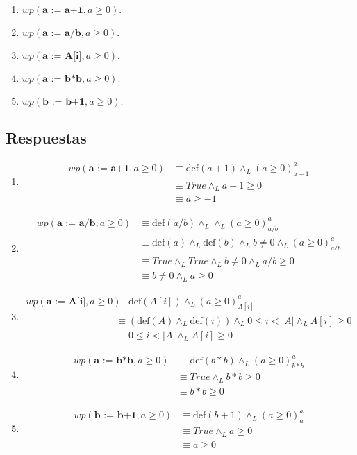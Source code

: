 \documentclass{article}
\begin{document}
\begin{enumerate}[label=\alph*)]
\item $wp(\textbf{a := a+1}, a \geq 0).$
\item $wp(\textbf{a := a/b}, a \geq 0).$
\item $wp(\textbf{a := A[i]}, a \geq 0).$
\item $wp(\textbf{a := b*b}, a \geq 0).$
\item $wp(\textbf{b := b+1}, a \geq 0).$
\end{enumerate}

\subsection*{Respuestas}

\begin{enumerate}[label=\alph*)]
	\item 
		\begin{align*}
			wp(\textbf{a := a+1}, a \geq 0) &\equiv \textrm{def}(a+1)
				\wedge_L (a\geq 0)_{a+1}^a\\
			&\equiv True\wedge_L a+1\geq 0\\
			&\equiv a\geq -1
		\end{align*}
	\item
		\begin{align*}
			wp(\textbf{a := a/b}, a \geq 0) &\equiv \textrm{def}(a/b)\wedge_L 
		    \wedge_L (a\geq 0)_{a/b}^a \\
			&\equiv \textrm{def}(a)\wedge_L 
			\textrm{def}(b)\wedge_L b\neq 0 \wedge_L (a\geq 0)_{a/b}^a\\
			&\equiv True\wedge_L True \wedge_L b\neq 0\wedge_L  a/b\geq 0\\
			&\equiv b\neq 0 \wedge_L a \geq 0
		\end{align*}
	\item
		\begin{align*}
			wp(\textbf{a := A[i]}, a \geq 0) &\equiv \textrm{def}(A[i])
				\wedge_L (a\geq 0)_{A[i]}^a\\
			&\equiv (\textrm{def}(A)\wedge_L 
			\textrm{def}(i)) \wedge_L 0\leq i <|A| \wedge_L A[i]\geq 0\\
			&\equiv 0\leq i <|A| \wedge_L A[i]\geq 0
		\end{align*}
	\item
		\begin{align*}
			wp(\textbf{a := b*b}, a \geq 0) &\equiv \textrm{def}(b*b)
				\wedge_L (a\geq 0)_{b*b}^a\\
			&\equiv True\wedge_L b*b\geq 0\\
			&\equiv b*b\geq 0
		\end{align*}
	\item
		\begin{align*}
			wp(\textbf{b := b+1}, a \geq 0) &\equiv \textrm{def}(b+1)
				\wedge_L (a\geq 0)_{a}^a\\
			&\equiv True\wedge_L a\geq 0\\
			&\equiv a\geq 0
		\end{align*}
\end{enumerate}
\end{document}
